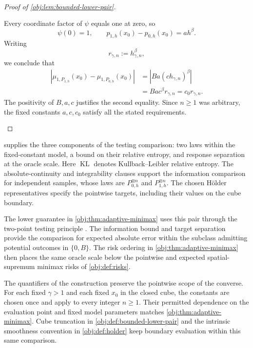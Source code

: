 \documentclass[11pt]{article}
\begin{document}
\begin{proof}[Proof of \cref{obj:lem:bounded-lower-pair}]
\begin{enumerate}
Every coordinate factor of \(\psi\) equals one at zero, so
\[
\psi(0)=1,
\qquad
p_{1,h}(x_0)-p_{0,h}(x_0)=ah^\beta.
\]
Writing
\[
r_{\gamma,n}:=h_{\gamma,n}^{\beta},
\]
we conclude that
\[
\begin{aligned}
\left|\mu_{1,P_{1,h}}(x_0)-\mu_{1,P_{0,h}}(x_0)\right|
&=\left|Ba(ch_{\gamma,n})^\beta\right|\\
&=Bac^\beta r_{\gamma,n}
=c_0r_{\gamma,n}.
\end{aligned}
\]
The positivity of \(B,a,c\) justifies the second equality. Since \(n\ge1\)
was arbitrary, the fixed constants \(a,c,c_0\) satisfy all the stated
requirements.
\end{enumerate}
\end{proof}

 supplies the three components of the testing comparison: two laws within the fixed-constant model, a bound on their relative entropy, and response separation at the oracle scale. Here \(\operatorname{KL}\) denotes Kullback--Leibler relative entropy. The absolute-continuity and integrability clauses support the information comparison for independent samples, whose laws are \(P_{0,h}^{\otimes n}\) and \(P_{1,h}^{\otimes n}\). The chosen Hölder representatives specify the pointwise targets, including their values on the cube boundary.

The lower guarantee in \cref{obj:thm:adaptive-minimax} uses this pair through the two-point testing principle \citep[Section~2.2]{tsybakov2009}. The information bound and target separation provide the comparison for expected absolute error within the subclass admitting potential outcomes in \(\{0,B\}\). The risk ordering in \cref{obj:thm:adaptive-minimax} then places the same oracle scale below the pointwise and expected spatial-supremum minimax risks of \cref{obj:def:risks}.

The quantifiers of the construction preserve the pointwise scope of the converse. For each fixed \(\gamma>1\) and each fixed \(x_0\) in the closed cube, the constants are chosen once and apply to every integer \(n\ge1\). Their permitted dependence on the evaluation point and fixed model parameters matches \cref{obj:thm:adaptive-minimax}. Cube truncation in \cref{obj:def:bounded-lower-pair} and the intrinsic smoothness convention in \cref{obj:def:holder} keep boundary evaluation within this same comparison.
\end{document}
